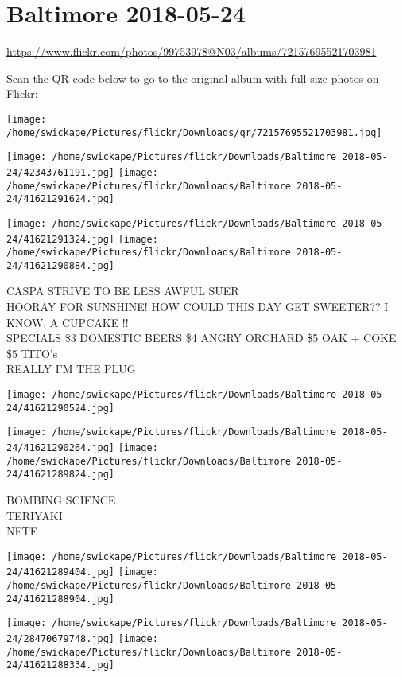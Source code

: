 \documentclass[10pt,letterpaper]{article}
\title{}
\author{}
\date{}
\begin{document}
\section*{Baltimore 2018-05-24}

\url{https://www.flickr.com/photos/99753978@N03/albums/72157695521703981}

Scan the QR code below to go to the original album with full-size photos on Flickr:

\texttt{[image: /home/swickape/Pictures/flickr/Downloads/qr/72157695521703981.jpg]}
\pagebreak

\texttt{[image: /home/swickape/Pictures/flickr/Downloads/Baltimore 2018-05-24/42343761191.jpg]}
\texttt{[image: /home/swickape/Pictures/flickr/Downloads/Baltimore 2018-05-24/41621291624.jpg]}

\texttt{[image: /home/swickape/Pictures/flickr/Downloads/Baltimore 2018-05-24/41621291324.jpg]}
\texttt{[image: /home/swickape/Pictures/flickr/Downloads/Baltimore 2018-05-24/41621290884.jpg]}

CASPA STRIVE TO BE LESS AWFUL SUER\\
HOORAY FOR SUNSHINE!  HOW COULD THIS DAY GET SWEETER??  I KNOW, A CUPCAKE !!\\
SPECIALS \$3 DOMESTIC BEERS \$4 ANGRY ORCHARD \$5 OAK + COKE \$5 TITO's\\
REALLY I'M THE PLUG
\pagebreak

\texttt{[image: /home/swickape/Pictures/flickr/Downloads/Baltimore 2018-05-24/41621290524.jpg]}

\vspace{0.25in}
\texttt{[image: /home/swickape/Pictures/flickr/Downloads/Baltimore 2018-05-24/41621290264.jpg]}
\texttt{[image: /home/swickape/Pictures/flickr/Downloads/Baltimore 2018-05-24/41621289824.jpg]}

BOMBING SCIENCE\\
TERIYAKI\\
NFTE
\pagebreak

\texttt{[image: /home/swickape/Pictures/flickr/Downloads/Baltimore 2018-05-24/41621289404.jpg]}
\texttt{[image: /home/swickape/Pictures/flickr/Downloads/Baltimore 2018-05-24/41621288904.jpg]}

\texttt{[image: /home/swickape/Pictures/flickr/Downloads/Baltimore 2018-05-24/28470679748.jpg]}
\texttt{[image: /home/swickape/Pictures/flickr/Downloads/Baltimore 2018-05-24/41621288334.jpg]}
\end{document}
